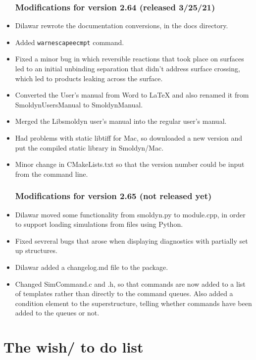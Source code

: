 \documentclass {scrbook}
\newcommand {\ttt} {\texttt}
\begin{document}
\begin{itemize}
\subsection*{Modifications for version 2.64 (released 3/25/21)}
\item Dilawar rewrote the documentation conversions, in the docs directory.
\item Added \ttt{warnescapeecmpt} command.
\item Fixed a minor bug in which reversible reactions that took place on surfaces led to an initial unbinding separation that didn't address surface crossing, which led to products leaking across the surface.
\item Converted the User's manual from Word to LaTeX and also renamed it from SmoldynUsersManual to SmoldynManual.
\item Merged the Libsmoldyn user's manual into the regular user's manual.
\item Had problems with static libtiff for Mac, so downloaded a new version and put the compiled static library in Smoldyn/Mac.
\item Minor change in CMakeLists.txt so that the version number could be input from the command line.

\subsection*{Modifications for version 2.65 (not released yet)}
\item Dilawar moved some functionality from smoldyn.py to module.cpp, in order to support loading simulations from files using Python.
\item Fixed sevreral bugs that arose when displaying diagnostics with partially set up structures.
\item Dilawar added a changelog.md file to the package.
\item Changed SimCommand.c and .h, so that commands are now added to a list of templates rather than directly to the command queues. Also added a condition element to the superstructure, telling whether commands have been added to the queues or not.

\end{itemize}


\chapter{The wish/ to do list}
\end{document}
